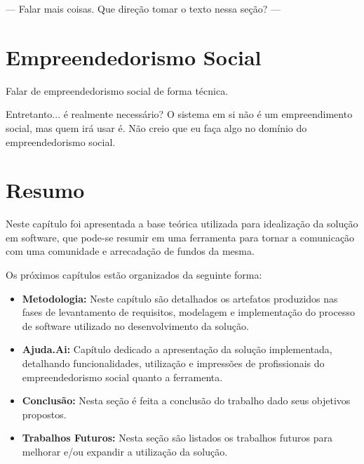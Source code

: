--- Falar mais coisas. Que direção tomar o texto nessa seção? ---



\section{Empreendedorismo Social}
Falar de empreendedorismo social de forma técnica.

Entretanto... é realmente necessário? O sistema em si não é um empreendimento social, mas quem irá usar é. Não creio que eu faça algo no domínio do empreendedorismo social.



\section*{Resumo}
Neste capítulo foi apresentada a base teórica utilizada para idealização da solução em software, que pode-se resumir em uma ferramenta para tornar a comunicação com uma comunidade e arrecadação de fundos da mesma.

Os próximos capítulos estão organizados da seguinte forma:

\begin{itemize}
  \item \textbf{Metodologia:} Neste capítulo são detalhados os artefatos produzidos nas fases de levantamento de requisitos, modelagem e implementação do processo de software utilizado no desenvolvimento da solução.
  \item \textbf{Ajuda.Ai:} Capítulo dedicado a apresentação da solução implementada, detalhando funcionalidades, utilização e impressões de profissionais do empreendedorismo social quanto a ferramenta.
  \item \textbf{Conclusão:} Nesta seção é feita a conclusão do trabalho dado seus objetivos propostos.
  \item \textbf{Trabalhos Futuros:} Nesta seção são listados os trabalhos futuros para melhorar e/ou expandir a utilização da solução.
\end{itemize}